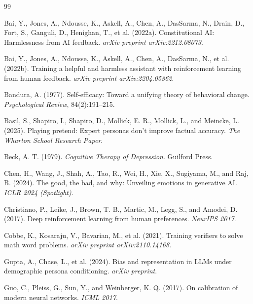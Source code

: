\documentclass[11pt,a4paper]{article}
\begin{document}

\begin{thebibliography}{99}

Bai, Y., Jones, A., Ndousse, K., Askell, A., Chen, A., DasSarma, N., Drain, D., Fort, S., Ganguli, D., Henighan, T., et al. (2022a).
\newblock Constitutional AI: Harmlessness from AI feedback.
\newblock \emph{arXiv preprint arXiv:2212.08073}.

Bai, Y., Jones, A., Ndousse, K., Askell, A., Chen, A., DasSarma, N., et al. (2022b).
\newblock Training a helpful and harmless assistant with reinforcement learning from human feedback.
\newblock \emph{arXiv preprint arXiv:2204.05862}.

Bandura, A. (1977).
\newblock Self-efficacy: Toward a unifying theory of behavioral change.
\newblock \emph{Psychological Review}, 84(2):191--215.

Basil, S., Shapiro, I., Shapiro, D., Mollick, E. R., Mollick, L., and Meincke, L. (2025).
\newblock Playing pretend: Expert personas don't improve factual accuracy.
\newblock \emph{The Wharton School Research Paper}.

Beck, A. T. (1979).
\newblock \emph{Cognitive Therapy of Depression}.
\newblock Guilford Press.

Chen, H., Wang, J., Shah, A., Tao, R., Wei, H., Xie, X., Sugiyama, M., and Raj, B. (2024).
\newblock The good, the bad, and why: Unveiling emotions in generative AI.
\newblock \emph{ICLR 2024 (Spotlight)}.

Christiano, P., Leike, J., Brown, T. B., Martic, M., Legg, S., and Amodei, D. (2017).
\newblock Deep reinforcement learning from human preferences.
\newblock \emph{NeurIPS 2017}.

Cobbe, K., Kosaraju, V., Bavarian, M., et al. (2021).
\newblock Training verifiers to solve math word problems.
\newblock \emph{arXiv preprint arXiv:2110.14168}.

Gupta, A., Chase, L., et al. (2024).
\newblock Bias and representation in LLMs under demographic persona conditioning.
\newblock \emph{arXiv preprint}.

Guo, C., Pleiss, G., Sun, Y., and Weinberger, K. Q. (2017).
\newblock On calibration of modern neural networks.
\newblock \emph{ICML 2017}.


\end{thebibliography}
\end{document}
